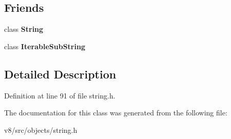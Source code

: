 \subsection*{Friends}
\begin{DoxyCompactItemize}
\item 
\mbox{\label{classv8_1_1internal_1_1String_1_1FlatContent_a7fb804f7dc96dd9f705c84095f37f1ca}} 
class {\bfseries String}
\item 
\mbox{\label{classv8_1_1internal_1_1String_1_1FlatContent_ae46cd6f0ea9e1edb46e2f776d1db15fb}} 
class {\bfseries Iterable\+Sub\+String}
\end{DoxyCompactItemize}


\subsection{Detailed Description}


Definition at line 91 of file string.\+h.



The documentation for this class was generated from the following file\+:\begin{DoxyCompactItemize}
\item 
v8/src/objects/string.\+h\end{DoxyCompactItemize}
